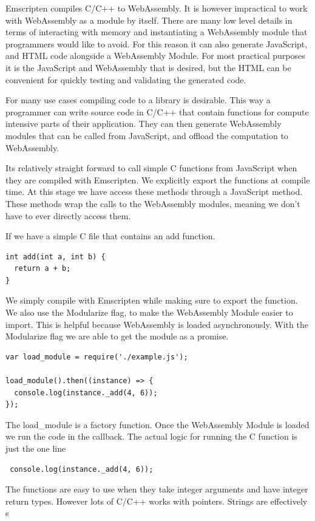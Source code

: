 \documentclass[11pt]{book}
\begin{document}
Emscripten compiles C/C++ to WebAssembly. It is however impractical to work with WebAssembly as a module by itself. There are many low level details in terms of interacting with memory and instantiating a WebAssembly module that programmers would like to avoid. For this reason it can also generate JavaScript, and HTML code alongside a WebAssembly Module. For most practical purposes it is the JavaScript and WebAssembly that is desired, but the HTML can be convenient for quickly testing and validating the generated code. 

For many use cases compiling code to a library is desirable. This way a programmer can write source code in C/C++ that contain functions for compute intensive parts of their application. They can then generate WebAssembly modules that can be called from JavaScript, and offload the computation to WebAssembly. 

Its relatively straight forward to call simple C functions from JavaScript when they are compiled with Emscripten. We explicitly export the functions at compile time. At this stage we have access these methods through a JavaScript method. These methods wrap the calls to the WebAssembly modules, meaning we don't have to ever directly access them.

If we have a simple C file that contains an add function.
\begin{verbatim}
int add(int a, int b) {
  return a + b;
}
\end{verbatim}
We simply compile with Emscripten while making sure to export the function. We also use the Modularize flag, to make the WebAssembly Module easier to import. This is helpful because WebAssembly is loaded asynchronously. With the Modularize flag we are able to get the module as a promise.

\begin{verbatim}
var load_module = require('./example.js');

load_module().then((instance) => {
  console.log(instance._add(4, 6));
});
\end{verbatim}

The load\_module is a factory function. Once the WebAssembly Module is loaded we run the code in the callback. The actual logic for running the C function is just the one line
\begin{verbatim}
 console.log(instance._add(4, 6));
\end{verbatim}

The functions are easy to use when they take integer arguments and have integer return types. However lots of C/C++ works with pointers. Strings are effectively s
\end{document}
